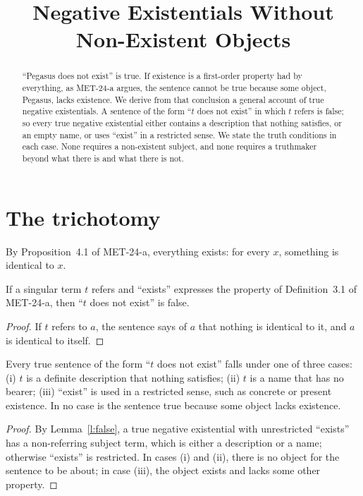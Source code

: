 \documentclass{situationist-preprint}
\title{Negative Existentials Without Non-Existent Objects}
\begin{document}
\maketitle

\begin{abstract}
\enquote{Pegasus does not exist} is true. If existence is a first-order property had by everything, as MET-24-a argues, the sentence cannot be true because some object, Pegasus, lacks existence. We derive from that conclusion a general account of true negative existentials. A sentence of the form \enquote{$t$ does not exist} in which $t$ refers is false; so every true negative existential either contains a description that nothing satisfies, or an empty name, or uses \enquote{exist} in a restricted sense. We state the truth conditions in each case. None requires a non-existent subject, and none requires a truthmaker beyond what there is and what there is not.
\end{abstract}

\section{The trichotomy}

By Proposition~4.1 of MET-24-a, everything exists: for every $x$, something is identical to $x$.

\begin{lemma}\label{l:false}
If a singular term $t$ refers and \enquote{exists} expresses the property of Definition~3.1 of MET-24-a, then \enquote{$t$ does not exist} is false.
\end{lemma}

\begin{proof}
If $t$ refers to $a$, the sentence says of $a$ that nothing is identical to it, and $a$ is identical to itself.
\end{proof}

\begin{corollary}\label{c:trich}
Every true sentence of the form \enquote{$t$ does not exist} falls under one of three cases: (i) $t$ is a definite description that nothing satisfies; (ii) $t$ is a name that has no bearer; (iii) \enquote{exist} is used in a restricted sense, such as concrete or present existence. In no case is the sentence true because some object lacks existence.
\end{corollary}

\begin{proof}
By Lemma~\ref{l:false}, a true negative existential with unrestricted \enquote{exists} has a non-referring subject term, which is either a description or a name; otherwise \enquote{exists} is restricted. In cases (i) and (ii), there is no object for the sentence to be about; in case (iii), the object exists and lacks some other property.
\end{proof}
\end{document}
